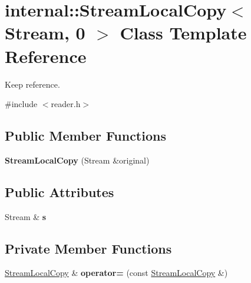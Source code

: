 \hypertarget{classinternal_1_1_stream_local_copy_3_01_stream_00_010_01_4}{}\section{internal\+:\+:Stream\+Local\+Copy$<$ Stream, 0 $>$ Class Template Reference}
\label{classinternal_1_1_stream_local_copy_3_01_stream_00_010_01_4}


Keep reference.  




{\ttfamily \#include $<$reader.\+h$>$}

\subsection*{Public Member Functions}
\begin{DoxyCompactItemize}
\item 
{\bfseries Stream\+Local\+Copy} (Stream \&original)\hypertarget{classinternal_1_1_stream_local_copy_3_01_stream_00_010_01_4_ac684a7be07d79d6ddd274dc1150f4b79}{}\label{classinternal_1_1_stream_local_copy_3_01_stream_00_010_01_4_ac684a7be07d79d6ddd274dc1150f4b79}

\end{DoxyCompactItemize}
\subsection*{Public Attributes}
\begin{DoxyCompactItemize}
\item 
Stream \& {\bfseries s}\hypertarget{classinternal_1_1_stream_local_copy_3_01_stream_00_010_01_4_ad31147888384f4bd51eabc2d7acdc4b6}{}\label{classinternal_1_1_stream_local_copy_3_01_stream_00_010_01_4_ad31147888384f4bd51eabc2d7acdc4b6}

\end{DoxyCompactItemize}
\subsection*{Private Member Functions}
\begin{DoxyCompactItemize}
\item 
\hyperlink{classinternal_1_1_stream_local_copy}{Stream\+Local\+Copy} \& {\bfseries operator=} (const \hyperlink{classinternal_1_1_stream_local_copy}{Stream\+Local\+Copy} \&)\hypertarget{classinternal_1_1_stream_local_copy_3_01_stream_00_010_01_4_a951778536f05d1f818f67c1c0342858c}{}\label{classinternal_1_1_stream_local_copy_3_01_stream_00_010_01_4_a951778536f05d1f818f67c1c0342858c}

\end{DoxyCompactItemize}


